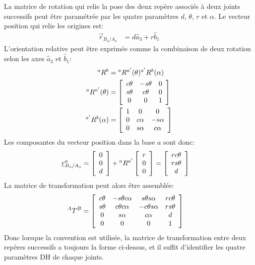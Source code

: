 La matrice de rotation qui relie la pose des deux repère associés à deux joints successifs peut être paramétrée par les quatre paramètres $d$, $\theta$, $r$ et $\alpha$. Le vecteur position qui relie les origines est:
\begin{align}
\vec{r}_{B_o/A_o} &=  d \hat{a}_3 + r \hat{b}_1
\end{align} 
L'orientation relative peut être exprimée comme la combinaison de deux rotation selon les axes $\hat{a}_3$ et $\hat{b}_1$:
\begin{align}
{}^aR^b &= {}^aR^{a'}(\theta) {}^{a'}R^b(\alpha) \\
{}^aR^{a'}(\theta)  &=
\left[ \begin{array}{c c c}
	c\theta & -s\theta & 0 \\
	s\theta & c\theta & 0 \\
	0 & 0 & 1 
\end{array}  \right]  \\
{}^{a'}R^b(\alpha)  &=
\left[ \begin{array}{c c c}
	1 & 0 & 0 \\
	0 & c\alpha & -s\alpha \\
	0 & s\alpha & c\alpha 
\end{array}  \right]  
\end{align} 
Les composantes du vecteur position dans la base $a$ sont donc:
\begin{align}
\underline{r}_{B_o/A_o}^a &=  
\left[ \begin{array}{c}
0 \\
0 \\
d
\end{array}  \right]  + {}^aR^{a'} \left[ \begin{array}{c}
r \\
0 \\
0
\end{array}  \right]  = \left[ \begin{array}{c}
r c\theta \\
r s\theta \\
d
\end{array}  \right] 
\end{align} 
La matrice de transformation peut alors être assemblée:
\begin{align}
{}^AT^{B} &=
\left[ \begin{array}{c c c c }
c\theta & -s\theta c\alpha & s\theta s\alpha & r c\theta\\
s\theta & c\theta c\alpha  & -c\theta s\alpha  & r s\theta\\
0 & s\alpha & c\alpha  &  d\\
0 & 0 & 0 & 1 
\end{array}  \right]  
\end{align} 
Donc lorsque la convention est utilisée, la matrice de transformation entre deux repères successifs a toujours la forme ci-dessus, et il suffit d'identifier les quatre paramètres DH de chaque joints. 

